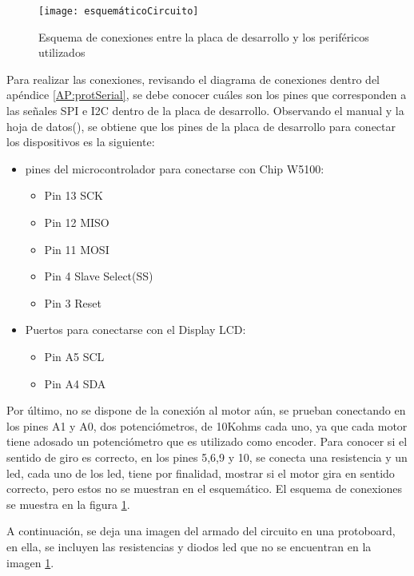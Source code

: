 \begin{figure}[ht!]
	\centering 
	\texttt{[image: esquemáticoCircuito]}
	\caption{Esquema de conexiones entre la placa de desarrollo y los periféricos utilizados} 
	\label{fig:esq_completo} 
\end{figure}

  
Para realizar las conexiones, revisando el diagrama de conexiones dentro del apéndice \ref{AP:protSerial}, se debe conocer cuáles son los pines que corresponden a las señales SPI e I2C dentro de la placa de desarrollo. Observando el manual y la hoja de datos(\cite{arduno}), se obtiene que los pines de la placa de desarrollo para conectar los dispositivos es la siguiente: 
\begin{itemize}
	\item pines del microcontrolador para conectarse con Chip  W5100:  
	\begin{itemize}
		\item Pin 13  SCK 
		\item Pin 12  MISO 
		\item Pin 11  MOSI 
		\item Pin 4   Slave Select(SS)
		\item Pin 3   Reset 	
	\end{itemize}
	\item Puertos para conectarse con el Display LCD:    
	\begin{itemize} 
		\item Pin A5  SCL
		\item Pin A4  SDA
	\end{itemize}  
\end{itemize}  

Por último, no se dispone de la conexión al motor aún, se prueban conectando en los pines A1 y A0, dos potenciómetros, de 10Kohms cada uno, ya que cada motor tiene adosado un potenciómetro que es utilizado como encoder. Para conocer si el sentido de giro es correcto, en los pines 5,6,9 y 10, se conecta una resistencia y un led, cada uno de los led, tiene por finalidad, mostrar si el motor gira en sentido correcto, pero estos no se muestran en el esquemático. El esquema de conexiones se muestra en la figura \ref{fig:esq_completo}.  

A continuación, se deja una imagen del armado del circuito en una protoboard, en ella, se incluyen las resistencias y diodos led que no se encuentran en la imagen \ref{fig:esq_completo}. 




